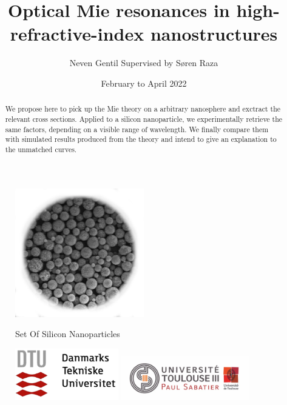 \documentclass{article}
\title{Optical Mie resonances in high-refractive-index nanostructures}
\author{Neven Gentil Supervised by Søren Raza}
\date{February to April 2022}
\numberwithin{equation}{section}
\begin{document}
\begin{titlingpage}
\maketitle
\begin{figure}[h!]
    \centering
    \includegraphics[width=0.5\textwidth, height=0.5\textwidth]{silicon_nanoparticles.png}

    Set Of Silicon Nanoparticles
\end{figure}
\begin{abstract}
We propose here to pick up the Mie theory on a arbitrary nanosphere and exctract the relevant cross sections. Applied to a silicon nanoparticle, we experimentally retrieve the same factors, depending on a visible range of wavelength. We finally compare them with simulated results produced from the theory and intend to give an explanation to the unmatched curves.
\end{abstract}
\begin{figure}[b]
    \begin{minipage}{0.48\textwidth}
        \includegraphics[width=0.4\textwidth, height=0.2\textwidth,left]{dtu_logo.png}
    \end{minipage}\hfill
    \begin{minipage}{0.48\textwidth}
        \includegraphics[width=0.5\textwidth, height=0.2\textwidth,right]{ut3_logo.png}
    \end{minipage}
\end{figure}
\end{titlingpage}
\end{document}
